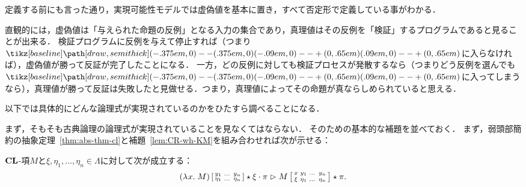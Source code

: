 \documentclass[realisability.tex]{subfiles}
\begin{document}
定義する前にも言った通り，実現可能性モデルでは虚偽値を基本に置き，すべて否定形で定義している事がわかる．

直観的には，虚偽値は「与えられた命題の反例」となる入力の集合であり，真理値はその反例を「検証」するプログラムであると見ることが出来る．
検証プログラムに反例を与えて停止すれば（つまり$\pole$に入らなければ），虚偽値が勝って反証が完了したことになる．
一方，どの反例に対しても検証プロセスが発散するなら（つまりどう反例を選んでも$\pole$に入ってしまうなら），真理値が勝って反証は失敗したと見做せる．つまり，真理値によってその命題が真ならしめられていると思える．

以下では具体的にどんな論理式が実現されているのかをひたすら調べることになる．

まず，そもそも古典論理の論理式が実現されていることを見なくてはならない．
そのための基本的な補題を並べておく．
まず，弱頭部簡約の抽象定理~\ref{thm:abs-thm-cl}と補題~\ref{lem:CR-wh-KM}を組み合わせれば次が示せる：
\begin{theorem}[抽象定理]\label{thm:abs-thm}
 $\mathord{\mathbf{CL}}$-項$M$と$\xi, \eta_1, \dots, \eta_n \in \Lambda$に対して次が成立する：
 \[
  (\lambda^{\mathsf{}}x.\;M)\left[\begin{smallmatrix}y_1 & \dots& y_n\\ \eta_1& \dots & \eta_n \end{smallmatrix}\right] \mathbin{\star} \xi \cdot \pi \mathrel{\rhd}
  M\left[\begin{smallmatrix}x & y_1 & \dots& y_n\\ \xi & \eta_1 & \dots &\eta_n \end{smallmatrix}\right] \mathbin{\star} \pi.
 \]
\end{theorem}
\end{document}
